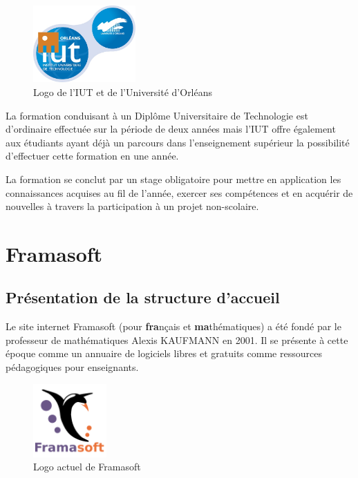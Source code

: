 \documentclass[10pt,a4paper, twoside]{report}
\begin{document}
	\begin{figure}[ht]
		\centering
		\includegraphics[width=0.35\textwidth]{images/logo-iut.png}
		\caption*{Logo de l'IUT et de l'Université d'Orléans}
		\label{normal_case}
	\end{figure}
	
	La formation conduisant à un Diplôme Universitaire de Technologie est d'ordinaire effectuée sur la période de deux années mais l'IUT offre également aux étudiants ayant déjà un parcours dans l'enseignement supérieur la possibilité d'effectuer cette formation en une année.
	
	La formation se conclut par un stage obligatoire pour mettre en application les connaissances acquises au fil de l'année, exercer ses compétences et en acquérir de nouvelles à travers la participation à un projet non-scolaire.
	
	\section{Framasoft}
	\subsection{Présentation de la structure d'accueil}
	
	Le site internet Framasoft (pour \textbf{fra}nçais et \textbf{ma}thématiques) a été fondé par le professeur de mathématiques Alexis KAUFMANN en 2001. Il se présente à cette époque comme un annuaire de logiciels libres et gratuits comme ressources pédagogiques pour enseignants.
	
	\begin{figure}[ht]
		\centering
		\includegraphics[width=0.25\textwidth]{images/Framasoft-Logo.png}
		\caption*{Logo actuel de Framasoft}
		\label{normal_case}
	\end{figure}
	
\end{document}
